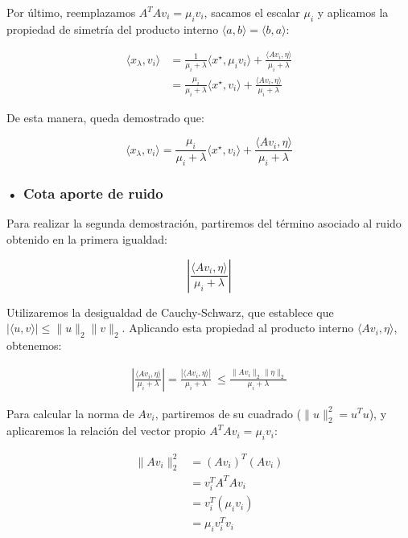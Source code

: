 \documentclass{article}
\begin{document}
\begin{enumerate}[label=\roman*., widest=iv]
  Por último, reemplazamos \(A^TAv_i=\mu_i v_i\), sacamos el escalar \(\mu_i\) y aplicamos la propiedad de simetría del producto interno \(\langle a,b\rangle=\langle b,a\rangle\):

  \[
  \begin{aligned}
  \langle x_\lambda,v_i\rangle
  &=\frac{1}{\mu_i+\lambda}\langle x^\star,\mu_i v_i\rangle+\frac{\langle Av_i,\eta\rangle}{\mu_i+\lambda}\\
  &=\frac{\mu_i}{\mu_i+\lambda}\langle x^\star,v_i\rangle+\frac{\langle Av_i,\eta\rangle}{\mu_i+\lambda}
  \end{aligned}
  \]

  De esta manera, queda demostrado que:

  \[
  \boxed{
  \langle x_\lambda,v_i\rangle
  =
  \frac{\mu_i}{\mu_i+\lambda}\langle x^\star,v_i\rangle
  +
  \frac{\langle Av_i,\eta\rangle}{\mu_i+\lambda}
  }
  \]

  \subsubsection*{• Cota aporte de ruido}

  Para realizar la segunda demostración, partiremos del término asociado al ruido obtenido en la primera igualdad:

  \[
  \left|\frac{\langle Av_i,\eta\rangle}{\mu_i+\lambda}\right|
  \]

  Utilizaremos la desigualdad de Cauchy-Schwarz, que establece que \(|\langle u,v\rangle|\leq\|u\|_2\|v\|_2\). Aplicando esta propiedad al producto interno \(\langle Av_i,\eta\rangle\), obtenemos:

  \[
  \begin{aligned}
  \left|\frac{\langle Av_i,\eta\rangle}{\mu_i+\lambda}\right|
  =\frac{|\langle Av_i,\eta\rangle|}{\mu_i+\lambda}\
  \leq\frac{\|Av_i\|_2\|\eta\|_2}{\mu_i+\lambda}
  \end{aligned}
  \]

  Para calcular la norma de \(Av_i\), partiremos de su cuadrado (\(\|u\|_2^2=u^Tu\)), y aplicaremos la relación del vector propio \(A^TAv_i=\mu_i v_i\):

  \[
  \begin{aligned}
  \|Av_i\|_2^2
  &=(Av_i)^T(Av_i)\\
  &=v_i^TA^TAv_i\\
  &=v_i^T(\mu_i v_i)\\
  &=\mu_i v_i^Tv_i
  \end{aligned}
  \]


\end{enumerate}
\end{document}
